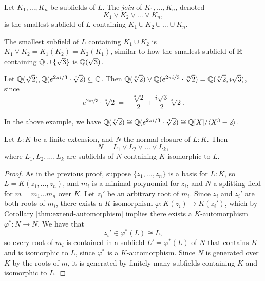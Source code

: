 \begin{definition}
  Let $K_1, \dots, K_n$ be subfields of $L$. The
  \emph{join} of $K_1, \dots, K_n$, denoted
  \[
    K_1 \lor K_2 \lor \dots \lor K_n,
  \]
  is the smallest subfield of $L$ containing
  $K_1 \cup K_2 \cup \dots \cup K_n$.
\end{definition}

\begin{remark}
  The smallest subfield of $L$ containing
  $K_1 \cup K_2$ is $K_1 \lor K_2 = K_1(K_2) = K_2(K_1)$,
  similar to how the smallest subfield of $\mathbb{R}$
  containing $\mathbb{Q} \cup \{\sqrt{3}\}$ is $\mathbb{Q}(\sqrt{3})$.
\end{remark}

\begin{example}
  Let $\mathbb{Q}(\sqrt[3]{2}), \mathbb{Q}(e^{2\pi i / 3} \cdot \sqrt[3]{2}) \subseteq \mathbb{C}$.
  Then
  $\mathbb{Q}(\sqrt[3]{2}) \lor \mathbb{Q}(e^{2\pi i / 3} \cdot \sqrt[3]{2}) = \mathbb{Q}(\sqrt[3]{2}, i\sqrt{3})$, since
  \[
    e^{2\pi i / 3} \cdot \sqrt[3]{2} = -\frac{\sqrt[3]{2}}{2} + \frac{i\sqrt{3}}{2} \sqrt[3]{2}.
  \]
\end{example}

\begin{remark}
  In the above example, we have
  $\mathbb{Q}(\sqrt[3]{2}) \cong \mathbb{Q}(e^{2\pi i / 3} \cdot \sqrt[3]{2}) \cong \mathbb{Q}[X] / \langle X^3 - 2 \rangle$.
\end{remark}

\begin{corollary}
  \label{cor:normal-closure}
  Let $L : K$ be a finite extension, and $N$ the normal
  closure of $L : K$. Then
  \[
    N = L_1 \lor L_2 \lor \dots \lor L_k,
  \]
  where $L_1, L_2, \dots, L_k$ are subfields of $N$
  containing $K$ isomorphic to $L$.
\end{corollary}

\begin{proof}
  As in the previous proof, suppose $\{z_1, \dots, z_n\}$
  is a basis for $L : K$, so $L = K(z_1, \dots, z_n)$,
  and $m_i$ is a minimal polynomial for $z_i$, and $N$
  a splitting field for $m = m_1 \dots m_n$ over $K$.
  Let $z_i'$ be an arbitrary root of $m_i$. Since
  $z_i$ and $z_i'$ are both roots of $m_i$, there exists
  a $K$-isomorphism $\varphi : K(z_i) \to K(z_i')$,
  which by Corollary \ref{thm:extend-automorphism} implies
  there exists a $K$-automorphism
  $\varphi^* : N \to N$. We have that
  \[
    z_i' \in \varphi^*(L) \cong L,
  \]
  so every root of $m_i$ is contained in a subfield
  $L' = \varphi^*(L)$ of $N$ that contains $K$ and is
  isomorphic to
  $L$, since $\varphi^*$ is a $K$-automorphism. Since
  $N$ is generated over $K$ by the roots of $m$, it is
  generated by finitely many subfields containing $K$
  and isomorphic to $L$.
\end{proof}

